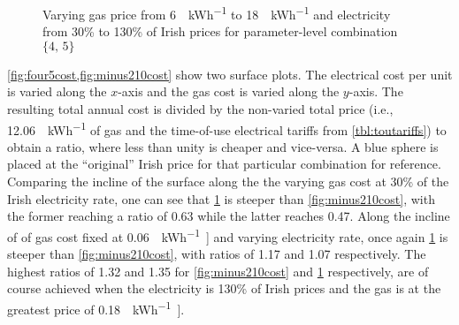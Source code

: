 

\begin{figure}[htb]
    \centering
    \caption{Varying gas price from \qty{6}{\cents\per\kWh} to \qty{18}{\cents\per\kWh} and electricity from 30\% to 130\% of Irish prices for parameter-level combination $\{4\text{, }5\}$}
    \label{fig:four5cost}
\end{figure}

\cref{fig:four5cost,fig:minus210cost} show two surface plots. The electrical cost per unit is varied along the $x$-axis and the gas cost is varied along the $y$-axis. The resulting total annual cost is divided by the non-varied total price (i.e., \qty{12.06}{\cents\per\kWh} of gas and the time-of-use electrical tariffs from \cref{tbl:toutariffs}) to obtain a ratio, where less than unity is cheaper and vice-versa. A blue sphere is placed at the ``original'' Irish price for that particular combination for reference. Comparing the incline of the surface along the the varying gas cost at 30\% of the Irish electricity rate, one can see that \cref{fig:four5cost} is steeper than \cref{fig:minus210cost}, with the former reaching a ratio of 0.63 while the latter reaches 0.47. Along the incline of of gas cost fixed at \qty{0.06}{\unit{\EUR\per\kWh}]} and varying electricity rate, once again \cref{fig:four5cost} is steeper than \cref{fig:minus210cost}, with ratios of 1.17 and 1.07 respectively. The highest ratios of 1.32 and 1.35 for \cref{fig:minus210cost} and \cref{fig:four5cost} respectively, are of course achieved when the electricity is 130\% of Irish prices and the gas is at the greatest price of \qty{0.18}{\unit{\EUR\per\kWh}]}.

